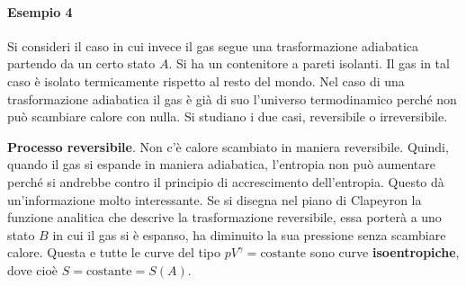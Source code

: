 \documentclass[10pt,a4paper]{book}
\begin{document}
\paragraph{Esempio 4} Si consideri il caso in cui invece il gas segue una trasformazione adiabatica partendo da un certo stato $A$. Si ha un contenitore a pareti isolanti. Il gas in tal caso è isolato termicamente rispetto al resto del mondo. Nel caso di una trasformazione adiabatica il gas è già di suo l'universo termodinamico perché non può scambiare calore con nulla. Si studiano i due casi, reversibile o irreversibile.

\textbf{Processo reversibile}. Non c'è calore scambiato in maniera reversibile. Quindi, quando il gas si espande in maniera adiabatica, l'entropia non può aumentare perché si andrebbe contro il principio di accrescimento dell'entropia. Questo dà un'informazione molto interessante. Se si disegna nel piano di Clapeyron la funzione analitica che descrive la trasformazione reversibile, essa porterà a uno stato $B$ in cui il gas si è espanso, ha diminuito la sua pressione senza scambiare calore. Questa e tutte le curve del tipo $pV^{\gamma}=\text{costante}$ sono curve \textbf{isoentropiche}, dove cioè $S=\text{costante}=S(A)$.
\end{document}
